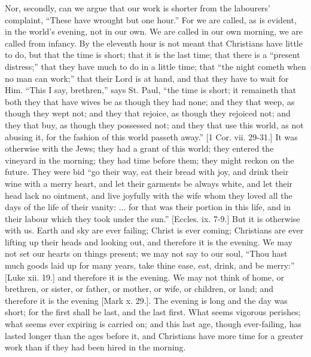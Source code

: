 Nor, secondly, can we argue that our work is shorter from the
labourers' complaint, ``These have wrought but one hour.'' For
we are called, as is evident, in the world's evening, not in our own.
We are called in our own morning, we are called from infancy. By the
eleventh hour is not meant that Christians have little to do, but that
the time is short; that it is the last time; that there is a
``present distress;'' that they have much to do in a little
time; that ``the night cometh when no man can work;'' that
their Lord is at hand, and that they have to wait for Him. ``This
I say, brethren,'' says St. Paul, ``the time is short; it
remaineth that both they that have wives be as though they had none;
and they that weep, as though they wept not; and they that rejoice, as
though they rejoiced not; and they that buy, as though they possessed
not; and they that use this world, as not abusing it, for the fashion
of this world passeth away.'' [1 Cor. vii. 29-31.] It was
otherwise with the Jews; they had a grant of this world; they entered
the vineyard in the morning; they had time before them; they might
reckon on the future. They were bid ``go their way, eat their
bread with joy, and drink their wine with a merry heart, and let their
garments be always white, and let their head lack no ointment, and
live joyfully with the wife whom they loved all the days of the life
of their vanity: ... for that was their portion in this life, and in
their labour which they took under the sun.'' [Eccles. ix. 7-9.]
But it is otherwise with us. Earth and sky are ever failing; Christ is
ever coming; Christians are ever lifting up their heads and looking
out, and therefore it is the evening. We may not set our hearts on
things present; we may not say to our soul, ``Thou hast much goods
laid up for many years, take thine ease, eat, drink, and be
merry:'' [Luke xii. 19.] and therefore it is the evening. We may
not think of home, or brethren, or sister, or father, or mother, or
wife, or children, or land; and therefore it is the evening [Mark x.
29.]. The evening is long and the day was short; for the first shall
be last, and the last first. What seems vigorous perishes; what seems
ever expiring is carried on; and this last age, though ever-failing,
has lasted longer than the ages before it, and Christians have more
time for a greater work than if they had been hired in the morning.


